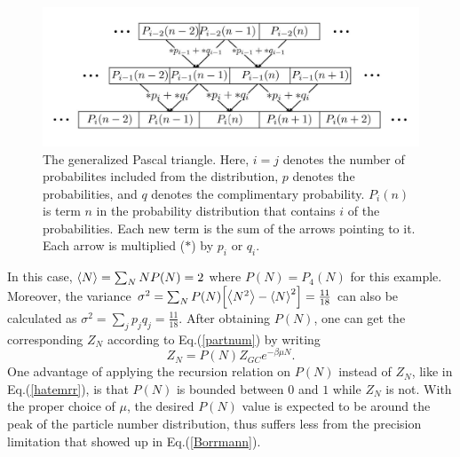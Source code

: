 \begin{figure}[H]
    \centering
    \includegraphics[scale=0.8]{figures/pdf/PBrecursion.jpg}
    \caption{The generalized Pascal triangle. Here, $i=j$ denotes the number of probabilites included from the distribution, $p$ denotes the probabilities, and $q$ denotes the complimentary probability. $P_i(n)$ is term $n$ in the probability distribution that contains $i$ of the probabilities. Each new term is the sum of the arrows pointing to it. Each arrow is multiplied ($*$) by $p_i$ or $q_i$.}
    \label{fig:General Poisson Binomial Recursion}
\end{figure}
In this case, $\left<{N}\right>=\sum_N N P(N)=2$ where $P(N)=P_4(N)$ for this example. Moreover, the variance $\sigma^2=\sum_N P(N)\qty[\left<{N^2}\right>-\left<{N}\right>^2]=\frac{11}{18}$ can also be calculated as $\sigma^2=\sum_j p_j q_j=\frac{11}{18}$. After obtaining $P(N)$, one can get the corresponding $Z_N$ according to Eq.\@ (\ref{partnum}) by writing 
\begin{equation}
    Z_N=P(N) Z_{GC} e^{-\beta\mu N}. \label{ZCasZGC}
\end{equation}
One advantage of applying the recursion relation on $P(N)$ instead of $Z_N$, like in Eq.\@ (\ref{hatemrr}), is that $P(N)$ is bounded between $0$ and $1$ while $Z_N$ is not. With the proper choice of $\mu$, the desired $P(N)$ value is expected to be around the peak of the particle number distribution, thus suffers less from the precision limitation that showed up in Eq.\@ (\ref{Borrmann}). 



